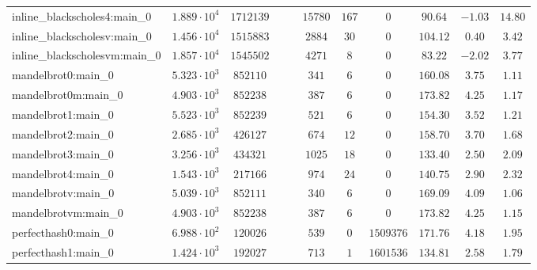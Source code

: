 \begin{tabular}{|l|c|c|c|c|c|c|c|c|c|c|}
inline\_blackscholes4:main\_0  & $ 1.889 \cdot 10^{4} $ & $ 1712139  $ & $  $ & $    $ & $ 15780  $ & $ 167  $ & $ 0        $ & $ 90.64       $ & $ -1.03   $ & $ 14.80   $ \\
inline\_blackscholesv:main\_0  & $ 1.456 \cdot 10^{4} $ & $ 1515883  $ & $  $ & $    $ & $ 2884   $ & $ 30   $ & $ 0        $ & $ 104.12      $ & $ 0.40    $ & $ 3.42    $ \\
inline\_blackscholesvm:main\_0 & $ 1.857 \cdot 10^{4} $ & $ 1545502  $ & $  $ & $    $ & $ 4271   $ & $ 8    $ & $ 0        $ & $ 83.22       $ & $ -2.02   $ & $ 3.77    $ \\
mandelbrot0:main\_0            & $ 5.323 \cdot 10^{3} $ & $ 852110   $ & $  $ & $    $ & $ 341    $ & $ 6    $ & $ 0        $ & $ 160.08      $ & $ 3.75    $ & $ 1.11    $ \\
mandelbrot0m:main\_0           & $ 4.903 \cdot 10^{3} $ & $ 852238   $ & $  $ & $    $ & $ 387    $ & $ 6    $ & $ 0        $ & $ 173.82      $ & $ 4.25    $ & $ 1.17    $ \\
mandelbrot1:main\_0            & $ 5.523 \cdot 10^{3} $ & $ 852239   $ & $  $ & $    $ & $ 521    $ & $ 6    $ & $ 0        $ & $ 154.30      $ & $ 3.52    $ & $ 1.21    $ \\
mandelbrot2:main\_0            & $ 2.685 \cdot 10^{3} $ & $ 426127   $ & $  $ & $    $ & $ 674    $ & $ 12   $ & $ 0        $ & $ 158.70      $ & $ 3.70    $ & $ 1.68    $ \\
mandelbrot3:main\_0            & $ 3.256 \cdot 10^{3} $ & $ 434321   $ & $  $ & $    $ & $ 1025   $ & $ 18   $ & $ 0        $ & $ 133.40      $ & $ 2.50    $ & $ 2.09    $ \\
mandelbrot4:main\_0            & $ 1.543 \cdot 10^{3} $ & $ 217166   $ & $  $ & $    $ & $ 974    $ & $ 24   $ & $ 0        $ & $ 140.75      $ & $ 2.90    $ & $ 2.32    $ \\
mandelbrotv:main\_0            & $ 5.039 \cdot 10^{3} $ & $ 852111   $ & $  $ & $    $ & $ 340    $ & $ 6    $ & $ 0        $ & $ 169.09      $ & $ 4.09    $ & $ 1.06    $ \\
mandelbrotvm:main\_0           & $ 4.903 \cdot 10^{3} $ & $ 852238   $ & $  $ & $    $ & $ 387    $ & $ 6    $ & $ 0        $ & $ 173.82      $ & $ 4.25    $ & $ 1.15    $ \\
perfecthash0:main\_0           & $ 6.988 \cdot 10^{2} $ & $ 120026   $ & $  $ & $    $ & $ 539    $ & $ 0    $ & $ 1509376  $ & $ 171.76      $ & $ 4.18    $ & $ 1.95    $ \\
perfecthash1:main\_0           & $ 1.424 \cdot 10^{3} $ & $ 192027   $ & $  $ & $    $ & $ 713    $ & $ 1    $ & $ 1601536  $ & $ 134.81      $ & $ 2.58    $ & $ 1.79    $ \\

\end{tabular}
